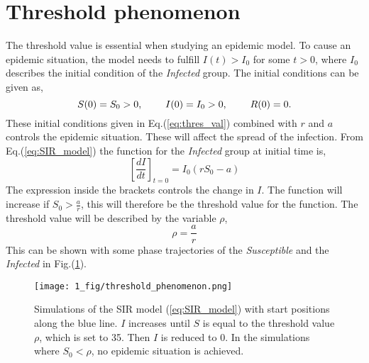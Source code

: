 \documentclass[%
twoside,                 %
final,                   %
chapterprefix=true,      %
open=right               %
10pt]{book}
\begin{document}
\section{Threshold phenomenon}
\label{section:1threshold_phenomenon}
The threshold value is essential when studying an epidemic model. To cause an epidemic situation, the model needs to fulfill $I(t)> I_0$ for some $t>0$, where $I_0$ describes the initial condition of  the \emph{Infected} group. The initial conditions can be given as,
\begin{equation} \label{eq:thres_val}
S(0)=S_0 > 0,\hspace{8mm} I(0)=I_0>0,\hspace{8mm} R(0) =0.
\end{equation}
These initial conditions given in Eq.(\ref{eq:thres_val}) combined with $r$ and $a$ controls the epidemic situation. These will affect the spread of the infection. From Eq.(\ref{eq:SIR_model}) the function for the \emph{Infected} group at initial time is,
\begin{equation}
\left[\frac{dI}{dt}\right]_{t=0} = I_0(rS_0-a)
\end{equation}
The expression inside the brackets controls the change in $I$. The function will increase if $S_0 > \frac{a}{r}$, this will therefore be the threshold value for the function. The threshold value will be described by the variable $\rho$,
\begin{equation} \label{eq:threshold_value}
\rho = \frac{a}{r}
\end{equation}
This can be shown with some phase trajectories of the \emph{Susceptible} and the \emph{Infected} in Fig.(\ref{fig:threshold_phenomenon}).  


\begin{figure}[ht]
  \centerline{\texttt{[image: 1\_fig/threshold\_phenomenon.png]}}
  \caption{
  \label{fig:threshold_phenomenon} Simulations of the SIR model (\ref{eq:SIR_model}) with start positions along the blue line. $I$ increases until $S$ is equal to the threshold value $\rho$, which is set to 35. Then $I$ is reduced to 0. In the simulations where $S_0 < \rho$, no epidemic situation is achieved.
  }
\end{figure}
\end{document}
